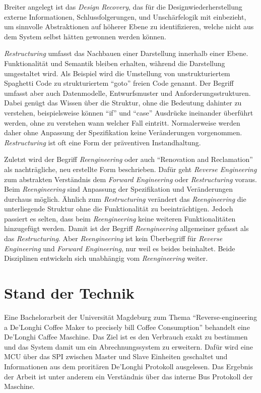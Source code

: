 Breiter angelegt ist das \textit{Design Recovery}, das für die Designwiederherstellung externe Informationen, Schlussfolgerungen, und Unschärfelogik mit einbezieht, um sinnvolle Abstraktionen auf höherer Ebene zu identifizieren, welche nicht aus dem System selbst hätten gewonnen werden können.

\textit{Restructuring} umfasst das Nachbauen einer Darstellung innerhalb einer Ebene. Funktionalität und Semantik bleiben erhalten, während die Darstellung umgestaltet wird. Als Beispiel wird die Umstellung von unstrukturiertem Spaghetti Code zu strukturiertem "`goto"' freien Code genannt. Der Begriff umfasst aber auch Datenmodelle, Entwurfsmuster und Anforderungsstrukturen. Dabei genügt das Wissen über die Struktur, ohne die Bedeutung dahinter zu verstehen, beispielsweise können "`if"' und "`case"' Ausdrücke ineinander überführt werden, ohne zu verstehen wann welcher Fall eintritt. Normalerweise werden daher ohne Anpassung der Spezifikation keine Veränderungen vorgenommen. \textit{Restructuring} ist oft eine Form der präventiven Instandhaltung.

Zuletzt wird der Begriff \textit{Reengineering} oder auch "`Renovation and Reclamation"' als nachträgliche, neu erstellte Form beschrieben. Dafür geht \textit{Reverse Engineering} zum abstrakten Verständnis dem \textit{Forward Engineering} oder \textit{Restructuring} voraus. Beim \textit{Reengineering} sind Anpassung der Spezifikation und Veränderungen durchaus möglich. Ähnlich zum \textit{Restructuring} verändert das \textit{Reengineering} die unterliegende Struktur ohne die Funktionalität zu beeinträchtigen. Jedoch passiert es selten, dass beim \textit{Reengineering} keine weiteren Funktionalitäten hinzugefügt werden. Damit ist der Begriff \textit{Reengineering} allgemeiner gefasst als das \textit{Restructuring}. Aber \textit{Reengineering} ist kein Überbegriff für \textit{Reverse Engineering} und \textit{Forward Engineering}, nur weil es beides beinhaltet. Beide Disziplinen entwickeln sich unabhängig vom \textit{Reengineering} weiter.

\section{Stand der Technik}
Eine Bachelorarbeit der Universität Magdeburg zum Thema "`Reverse-engineering a De'Longhi Coffee Maker to precisely bill Coffee Consumption"'\cite{BachelorarbeitDeLonghi} behandelt eine De'Longhi Caffee Maschine. Das Ziel ist es den Verbrauch exakt zu bestimmen und das System damit um ein Abrechnungssystem zu erweitern. Dafür wird eine \ac{MCU} über das \ac{SPI} zwischen Master und Slave Einheiten geschaltet und Informationen aus dem proritären De'Longhi Protokoll ausgelesen. Das Ergebnis der Arbeit ist unter anderem ein Verständnis über das interne Bus Protokoll der Maschine.


